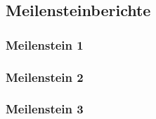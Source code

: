 \subsection{Meilensteinberichte}
\subsubsection{Meilenstein 1}


\newpage

\subsubsection{Meilenstein 2}


\newpage

\subsubsection{Meilenstein 3}


\newpage